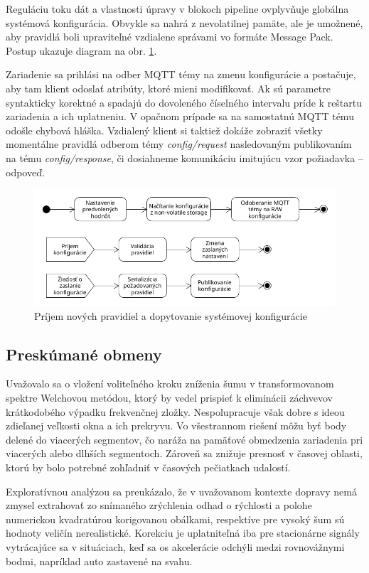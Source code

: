 Reguláciu toku dát a vlastnosti úpravy v blokoch pipeline ovplyvňuje globálna systémová konfigurácia. Obvykle sa nahrá
z nevolatilnej pamäte, ale je umožnené, aby pravidlá boli upraviteľné vzdialene správami vo formáte Message Pack. 
Postup ukazuje diagram na obr. \ref{config-change}.

Zariadenie sa prihlási na odber MQTT témy na zmenu konfigurácie a postačuje, aby tam klient odoslať atribúty, ktoré mieni
modifikovať. Ak sú parametre syntakticky korektné a spadajú do dovoleného číselného intervalu príde k reštartu zariadenia a ich
uplatneniu. V opačnom prípade sa na samostatnú MQTT tému odošle chybová hláška. Vzdialený klient si taktiež dokáže zobraziť 
všetky momentálne pravidlá odberom témy \emph{config/request} nasledovaným publikovaním na tému \emph{config/response}, či 
dosiahneme komunikáciu imitujúcu vzor požiadavka -- odpoveď.

\begin{figure}[h]
	\centering
	\includegraphics[width=\textwidth]{figures/design/configuration.png}
	\caption{Príjem nových pravidiel a dopytovanie systémovej konfigurácie}
	\label{config-change}
\end{figure}


\subsection{Preskúmané obmeny}
Uvažovalo sa o vložení voliteľného kroku zníženia šumu v transformovanom spektre Welchovou metódou, ktorý by vedel prispieť
k eliminácii záchvevov krátkodobého výpadku frekvenčnej zložky. Nespolupracuje však dobre s ideou zdieľanej veľkosti okna a 
ich prekryvu. Vo všestrannom riešení môžu byť body delené do viacerých segmentov, čo naráža na pamäťové obmedzenia zariadenia
pri viacerých alebo dlhších segmentoch. Zároveň sa znižuje presnosť v časovej oblasti, ktorú by bolo potrebné zohľadniť v časových
pečiatkach udalostí. 

Exploratívnou analýzou sa preukázalo, že v uvažovanom kontexte dopravy nemá zmysel extrahovať zo snímaného zrýchlenia odhad
o rýchlosti a polohe numerickou kvadratúrou korigovanou obálkami, respektíve pre vysoký šum sú hodnoty veličín nerealistické.
Korekciu je uplatniteľná iba pre stacionárne signály vytrácajúce sa v situáciach, keď sa os akcelerácie odchýli medzi 
rovnovážnymi bodmi, napríklad auto zastavené na svahu.

